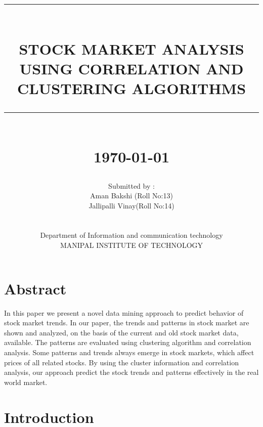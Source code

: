 \documentclass[12pt]{report}
\newcommand{\HRule}[1]{\rule{\linewidth}{#1}}
\begin{document}
\title{ \normalsize \textsc{}
		\\ [2.0cm]
		\HRule{0.5pt} \\
		\LARGE \textbf{\uppercase{Stock market analysis using correlation and  clustering 	algorithms}}
		\HRule{2pt} \\ [0.5cm]
		\normalsize \today \vspace*{5\baselineskip}}

\date{}

\author{
		Submitted by :\\ Aman Bakshi (Roll No:13)\\
        			   Jallipalli Vinay(Roll No:14)\\
                       \\\\
		Department of Information and communication technology\\
        		MANIPAL INSTITUTE OF TECHNOLOGY}

\maketitle
\tableofcontents
\newpage

\sectionfont{\scshape}

\section*{Abstract}
In this paper we present a novel data mining approach to predict behavior of stock market trends. In our paper, the trends and patterns in stock
market are shown and analyzed, on the basis of the current and old stock
market data, available. The patterns are evaluated using clustering algorithm
and correlation analysis. Some patterns and trends always emerge in stock
markets, which affect prices of all related stocks. By using the cluster information and correlation analysis, our approach predict the stock trends and
patterns effectively in the real world market.




\section*{Introduction}
\end{document}
